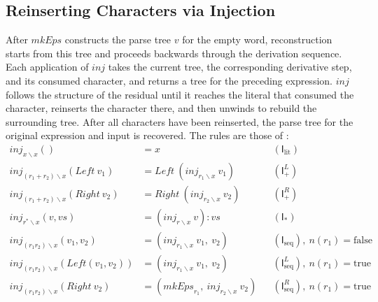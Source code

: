 %
%
%

\subsection{Reinserting Characters via Injection}
\label{sec:inj-theory}

After $\mathit{mkEps}$ constructs the parse tree $v$ for the empty word, 
reconstruction starts from this tree 
and proceeds backwards through the derivation sequence. 
Each application of $\mathit{inj}$ takes the current tree, 
the corresponding derivative step, and its consumed character, 
and returns a tree for the preceding expression.
$\mathit{inj}$ follows the structure of the residual 
until it reaches the literal that consumed the character, 
reinserts the character there, and then unwinds to rebuild the surrounding tree. 
After all characters have been reinserted, 
the parse tree for the original expression and input is recovered. 
The rules are those of \citep[Fig.~3]{sulzmannlu2014}:
\begin{equation}\label{eq:inj}
\begin{aligned}
\mathit{inj}_{x \backslash x}() &= x
  &&(\mathsf{I}_{\mathrm{lit}}) \\
\mathit{inj}_{(r_1+r_2) \backslash x}(\mathit{Left}\ v_1)
  &= \mathit{Left}\ (\mathit{inj}_{r_1 \backslash x}\ v_1)
  &&(\mathsf{I}_{+}^{L}) \\
\mathit{inj}_{(r_1+r_2) \backslash x}(\mathit{Right}\ v_2)
  &= \mathit{Right}\ (\mathit{inj}_{r_2 \backslash x}\ v_2)
  &&(\mathsf{I}_{+}^{R}) \\
\mathit{inj}_{r^{*} \backslash x}(v, vs)
  &= (\mathit{inj}_{r \backslash x}\ v) : vs
  &&(\mathsf{I}_{*}) \\
\mathit{inj}_{(r_1 r_2) \backslash x}(v_1, v_2)
  &= (\mathit{inj}_{r_1 \backslash x}\ v_1,\ v_2)
  &&(\mathsf{I}_{\mathrm{seq}}),\ n(r_1) = \mathrm{false} \\
\mathit{inj}_{(r_1 r_2) \backslash x}(\mathit{Left}(v_1, v_2))
  &= (\mathit{inj}_{r_1 \backslash x}\ v_1,\ v_2)
  &&(\mathsf{I}_{\mathrm{seq}}^{L}),\ n(r_1) = \mathrm{true} \\
\mathit{inj}_{(r_1 r_2) \backslash x}(\mathit{Right}\ v_2)
  &= (\mathit{mkEps}_{r_1},\ \mathit{inj}_{r_2 \backslash x}\ v_2)
  &&(\mathsf{I}_{\mathrm{seq}}^{R}),\ n(r_1) = \mathrm{true}
\end{aligned}
\end{equation}


